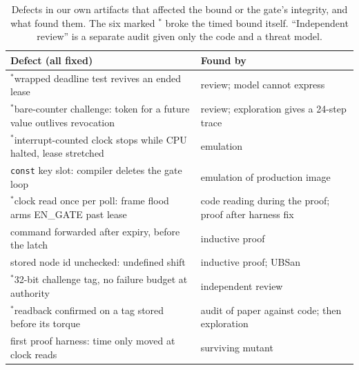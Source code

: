 \documentclass[letterpaper]{article} %
\newcommand{\code}[1]{\texttt{#1}}
\begin{document}
\begin{table}[t]
\centering
\footnotesize
\begin{tabular}{@{}p{4.55cm}p{2.8cm}@{}}
\toprule
Defect (all fixed) & Found by \\
\midrule
$^*$wrapped deadline test revives an ended lease & review; model cannot express \\
$^*$bare-counter challenge: token for a future value outlives revocation & review; exploration gives a 24-step trace \\
$^*$interrupt-counted clock stops while CPU halted, lease stretched & emulation \\
\code{const} key slot: compiler deletes the gate loop & emulation of production image \\
$^*$clock read once per poll: frame flood arms EN\_GATE past lease & code reading during the proof; proof after harness fix \\
command forwarded after expiry, before the latch & inductive proof \\
stored node id unchecked: undefined shift & inductive proof; UBSan \\
$^*$32-bit challenge tag, no failure budget at authority & independent review \\
$^*$readback confirmed on a tag stored before its torque & audit of paper against code; then exploration \\
first proof harness: time only moved at clock reads & surviving mutant \\
\bottomrule
\end{tabular}
\caption{Defects in our own artifacts that affected the bound or the gate's integrity, and
what found them. The six marked $^*$ broke the timed bound itself. ``Independent review'' is a
separate audit given only the code and a threat model.}
\label{tab:bugs}
\end{table}
\end{document}
